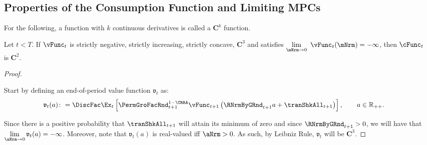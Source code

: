 \documentclass[\econtexRoot/BufferStockTheory]{subfiles}
\begin{document}
\subsection{Properties of the Consumption Function and Limiting MPCs}\label{sec:MPCiterproofs}

For the following, a function with $k$ continuous derivatives is called a $\mathbf{C}^{k}$ function. 

\begin{lemma}\label{lemm:consC2}
Let $t<T$. If $\vFunc_{t}$ is strictly negative, strictly increasing, strictly concave, $\mathbf{C}^{3}$ and satisfies $\lim\limits_{\mNrm\rightarrow 0}~\vFunc_{t}(\mNrm) =-\infty $, then $\cFunc_{t}$ is $\mathbf{C}^{2}$.
\end{lemma}


\begin{proof}

\hypertarget{BoroCnstNat}{}
%
Start by defining an end-of-period value function $\mathfrak{v}_{t}$ as:
%
\begin{equation}\label{eq:vfFrackdefn}
  \mathfrak{v}_{t}(a)\colon =\DiscFac \Ex_{t}\left[{\PermGroFacRnd}_{t+1}^{1-\CRRA}\vFunc_{t+1}\left({\RNrmByGRnd}_{t+1} a+{\tranShkAll}_{t+1}\right) \right], \qquad a\in \mathbb{R}_{++}. 
\end{equation}

Since there is a positive probability that $\tranShkAll_{t+1}$ will
attain its minimum of zero and since ${\RNrmByGRnd}_{t+1}>0$, we will have that $\lim\limits_{\aNrm \rightarrow 0} \mathfrak{v}_{t}(a) = -\infty$.
Moreover, note that
$\mathfrak{v}_{t}(a) $ is real-valued iff $\aNrm>0$.  As such, by Leibniz Rule,  $\mathfrak{v}_{t}$ will be $\mathbf{C}^{3}$.


\end{proof}
\end{document}
